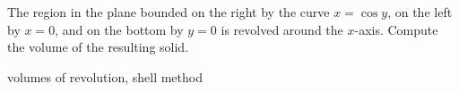 \documentclass{article}
\begin{document}
\begin{question}[2018.S.7]  %
The region in the plane bounded on the right by the curve $x = \cos y$, on the left by $x=0$, and on the bottom by $y = 0$ is revolved around the $x$-axis. Compute the volume of the resulting solid.
\begin{multiplechoice} 
 \choicebreak %
\end{multiplechoice}
\begin{keywords}volumes of revolution, shell method\end{keywords}
\end{question}


\scratchbreak  %
\end{document}
